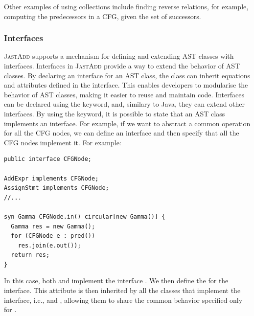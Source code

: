     Other examples of using collections include finding reverse relations, for example, 
    computing the predecessors in a CFG, given the set of successors.

\subsubsection{Interfaces}
\textsc{JastAdd} supports a mechanism for defining and extending AST classes with interfaces.
Interfaces in \textsc{JastAdd}  provide a way to extend the behavior 
of AST classes. By declaring an interface for an AST class, the class can inherit 
equations and attributes defined in the interface. 
This enables developers to modularise the behavior of AST classes, making it easier 
to reuse and maintain code.
Interfaces can be declared using the  keyword, and, similary to Java,
they can extend other interfaces.
By using the  keyword, it is possible to 
state that an AST class implements an interface.
For example, if we want to abstract a common operation for all the CFG nodes, we can define an interface
 and then specify that all the CFG nodes implement it. For example:
\begin{lstlisting}[language=JastAdd]
public interface CFGNode;

AddExpr implements CFGNode;
AssignStmt implements CFGNode;
//...

syn Gamma CFGNode.in() circular[new Gamma()] { 
  Gamma res = new Gamma(); 
  for (CFGNode e : pred()) 
    res.join(e.out()); 
  return res; 
}
\end{lstlisting}
In this case, both  and  implement the interface .
We then define the  for the  interface.
This attribute is then inherited by all the classes that implement the interface,
i.e.,  and , allowing them to share the 
common behavior specified only for .
